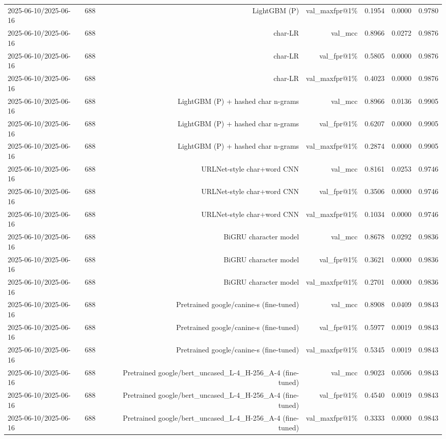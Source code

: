 \begin{table}[t]
\begin{tabular}{llrrrrr}
2025-06-10/2025-06-16 & 688 & LightGBM (P) & val\_maxfpr@1\% & 0.1954 & 0.0000 & 0.9780 \\
2025-06-10/2025-06-16 & 688 & char-LR & val\_mcc & 0.8966 & 0.0272 & 0.9876 \\
2025-06-10/2025-06-16 & 688 & char-LR & val\_fpr@1\% & 0.5805 & 0.0000 & 0.9876 \\
2025-06-10/2025-06-16 & 688 & char-LR & val\_maxfpr@1\% & 0.4023 & 0.0000 & 0.9876 \\
2025-06-10/2025-06-16 & 688 & LightGBM (P) + hashed char n-grams & val\_mcc & 0.8966 & 0.0136 & 0.9905 \\
2025-06-10/2025-06-16 & 688 & LightGBM (P) + hashed char n-grams & val\_fpr@1\% & 0.6207 & 0.0000 & 0.9905 \\
2025-06-10/2025-06-16 & 688 & LightGBM (P) + hashed char n-grams & val\_maxfpr@1\% & 0.2874 & 0.0000 & 0.9905 \\
2025-06-10/2025-06-16 & 688 & URLNet-style char+word CNN & val\_mcc & 0.8161 & 0.0253 & 0.9746 \\
2025-06-10/2025-06-16 & 688 & URLNet-style char+word CNN & val\_fpr@1\% & 0.3506 & 0.0000 & 0.9746 \\
2025-06-10/2025-06-16 & 688 & URLNet-style char+word CNN & val\_maxfpr@1\% & 0.1034 & 0.0000 & 0.9746 \\
2025-06-10/2025-06-16 & 688 & BiGRU character model & val\_mcc & 0.8678 & 0.0292 & 0.9836 \\
2025-06-10/2025-06-16 & 688 & BiGRU character model & val\_fpr@1\% & 0.3621 & 0.0000 & 0.9836 \\
2025-06-10/2025-06-16 & 688 & BiGRU character model & val\_maxfpr@1\% & 0.2701 & 0.0000 & 0.9836 \\
2025-06-10/2025-06-16 & 688 & Pretrained google/canine-s (fine-tuned) & val\_mcc & 0.8908 & 0.0409 & 0.9843 \\
2025-06-10/2025-06-16 & 688 & Pretrained google/canine-s (fine-tuned) & val\_fpr@1\% & 0.5977 & 0.0019 & 0.9843 \\
2025-06-10/2025-06-16 & 688 & Pretrained google/canine-s (fine-tuned) & val\_maxfpr@1\% & 0.5345 & 0.0019 & 0.9843 \\
2025-06-10/2025-06-16 & 688 & Pretrained google/bert\_uncased\_L-4\_H-256\_A-4 (fine-tuned) & val\_mcc & 0.9023 & 0.0506 & 0.9843 \\
2025-06-10/2025-06-16 & 688 & Pretrained google/bert\_uncased\_L-4\_H-256\_A-4 (fine-tuned) & val\_fpr@1\% & 0.4540 & 0.0019 & 0.9843 \\
2025-06-10/2025-06-16 & 688 & Pretrained google/bert\_uncased\_L-4\_H-256\_A-4 (fine-tuned) & val\_maxfpr@1\% & 0.3333 & 0.0000 & 0.9843 \\

\end{tabular}
\end{table}
